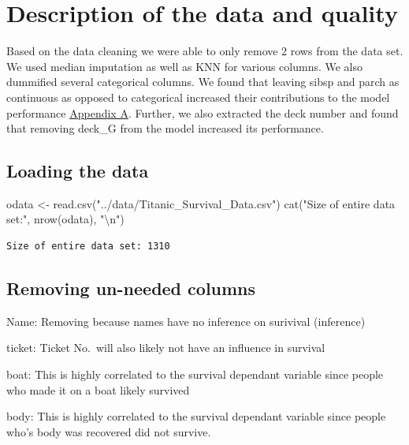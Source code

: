 \documentclass[
  letterpaper,
  DIV=11,
  numbers=noendperiod]{scrartcl}
\newenvironment{Shaded}{\begin{snugshade}}{\end{snugshade}}
\newcommand{\FunctionTok}[1]{\textcolor[rgb]{0.28,0.35,0.67}{#1}}
\newcommand{\NormalTok}[1]{\textcolor[rgb]{0.00,0.23,0.31}{#1}}
\newcommand{\OtherTok}[1]{\textcolor[rgb]{0.00,0.23,0.31}{#1}}
\newcommand{\SpecialCharTok}[1]{\textcolor[rgb]{0.37,0.37,0.37}{#1}}
\newcommand{\StringTok}[1]{\textcolor[rgb]{0.13,0.47,0.30}{#1}}
\begin{document}
\section{Description of the data and
quality}\label{description-of-the-data-and-quality}

Based on the data cleaning we were able to only remove 2 rows from the
data set. We used median imputation as well as KNN for various columns.
We also dummified several categorical columns. We found that leaving
sibsp and parch as continuous as opposed to categorical increased their
contributions to the model performance \hyperref[appendix_A]{Appendix
A}. Further, we also extracted the deck number and found that removing
deck\_G from the model increased its performance.

\subsection{Loading the data}\label{loading-the-data}

\begin{Shaded}
\begin{Highlighting}[]
\NormalTok{odata }\OtherTok{\textless{}{-}} \FunctionTok{read.csv}\NormalTok{(}\StringTok{"../data/Titanic\_Survival\_Data.csv"}\NormalTok{)}
\FunctionTok{cat}\NormalTok{(}\StringTok{"Size of entire data set:"}\NormalTok{, }\FunctionTok{nrow}\NormalTok{(odata), }\StringTok{"}\SpecialCharTok{\textbackslash{}n}\StringTok{"}\NormalTok{)}
\end{Highlighting}
\end{Shaded}

\begin{verbatim}
Size of entire data set: 1310 
\end{verbatim}

\subsection{Removing un-needed
columns}\label{removing-un-needed-columns}

Name: Removing because names have no inference on surivival (inference)

ticket: Ticket No.~will also likely not have an influence in survival

boat: This is highly correlated to the survival dependant variable since
people who made it on a boat likely survived

body: This is highly correlated to the survival dependant variable since
people who's body was recovered did not survive.
\end{document}
